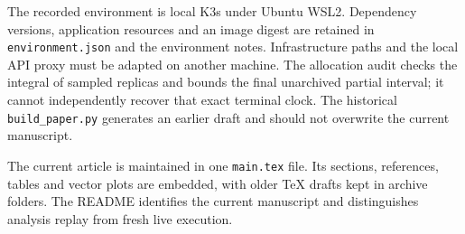 \documentclass[10pt,twocolumn,a4paper]{article}
\begin{document}
The recorded environment is local K3s under Ubuntu WSL2. Dependency versions, application resources and an image digest are retained in \texttt{environment.json} and the environment notes. Infrastructure paths and the local API proxy must be adapted on another machine. The allocation audit checks the integral of sampled replicas and bounds the final unarchived partial interval; it cannot independently recover that exact terminal clock. The historical \texttt{build\_paper.py} generates an earlier draft and should not overwrite the current manuscript.

The current article is maintained in one \texttt{main.tex} file. Its sections, references, tables and vector plots are embedded, with older TeX drafts kept in archive folders. The README identifies the current manuscript and distinguishes analysis replay from fresh live execution.
\end{document}
